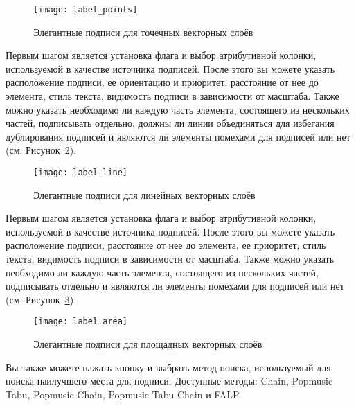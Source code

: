 \begin{figure}[ht]
\centering
   \texttt{[image: label\_points]}
   \caption{Элегантные подписи для точечных векторных слоёв \wincaption}\label{fig:pointlabel}
\end{figure}


Первым шагом является установка флага 
и выбор атрибутивной колонки, используемой в качестве источника подписей.
После этого вы можете указать расположение подписи, ее ориентацию и приоритет,
расстояние от нее до элемента, стиль текста, видимость подписи в зависимости
от масштаба. Также можно указать необходимо ли каждую часть элемента,
состоящего из нескольких частей, подписывать отдельно, должны ли линии
объединяться для избегания дублирования подписей и являются ли элементы
помехами для подписей или нет (см. Рисунок~\ref{fig:linelabel}).

\begin{figure}[ht]
\centering
   \texttt{[image: label\_line]}
   \caption{Элегантные подписи для линейных векторных слоёв \wincaption}\label{fig:linelabel}
\end{figure}


Первым шагом является установка флага 
и выбор атрибутивной колонки, используемой в качестве источника подписей.
После этого вы можете указать расположение подписи, расстояние от нее до
элемента, ее приоритет, стиль текста, видимость подписи в зависимости от
масштаба. Также можно указать необходимо ли каждую часть элемента, состоящего
из нескольких частей, подписывать отдельно и являются ли элементы помехами
для подписей или нет (см. Рисунок~\ref{fig:arealabel}).

\begin{figure}[ht]
\centering
   \texttt{[image: label\_area]}
   \caption{Элегантные подписи для площадных векторных слоёв \wincaption}\label{fig:arealabel}
\end{figure}


Вы также можете нажать кнопку  и выбрать метод поиска,
используемый для поиска наилучшего места для подписи. Доступные методы:
Chain, Popmusic Tabu, Popmusic Chain, Popmusic Tabu Chain и FALP.


